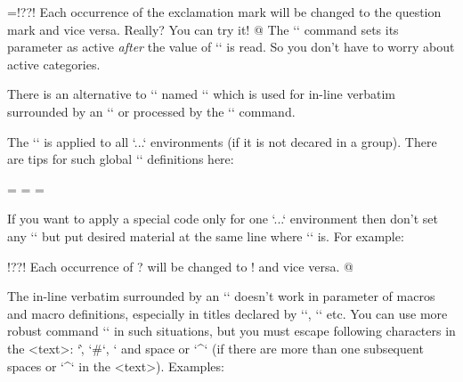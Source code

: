 \begtt   \adef@{\string\endtt}
\everytt={\adef!{?}\adef?{!}}
\begtt
Each occurrence of the exclamation mark will be changed to 
the question mark and vice versa. Really? You can try it! 
@
\endtt
%
The `\adef` command sets its parameter as active {\it after\/}
the value of `\everytt` is read. So you don't have to worry about active
categories. 

There is an alternative to `\everytt` named `\everyintt` which is used for
in-line verbatim surrounded by an `\activettchar` or processed by the `\code`
command.

The `\everytt` is applied to all `\begtt...\endtt` environments (if it is not
decared in a group). There are tips for such global `\everytt` definitions here:

\begtt
\everytt={\typosize[9/11]}      %
\everytt={}            %
\everytt={} %
\endtt

\new
If you want to apply a special code only for one `\begtt...\endtt`
environment then don't set any `\everytt` but put desired material at the 
same line where `\begtt` is. For example:

\begtt   \adef@{\string\endtt}
\begtt   \adef!{?}\adef?{!}
Each occurrence of ? will be changed to ! and vice versa. 
@
\endtt

The in-line verbatim surrounded by an `\activettchar` doesn't work in
parameter of macros and macro definitions, especially in titles declared by
`\chap`, `\sec` etc. 
\new
You can use more robust command `` in such
situations, but you must escape following characters in the <text>:
`\`, `#`, `%
and space or `^` (if there are more than one subsequent spaces or `^` in 
the <text>). Examples:

